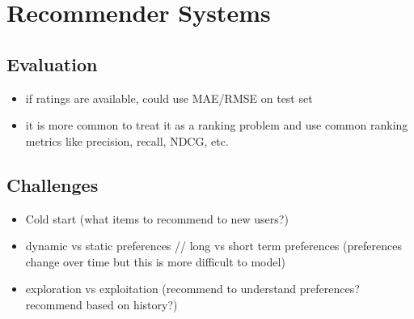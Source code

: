 \section{Recommender Systems}
\subsection{Evaluation}
\begin{itemize}
    \item if ratings are available, could use MAE/RMSE on test set
    \item it is more common to treat it as a ranking problem and use common ranking metrics like precision, recall, NDCG, etc.
\end{itemize}
\subsection{Challenges}
\begin{itemize}
    \item Cold start (what items to recommend to new users?)
    \item dynamic vs static preferences // long vs short term preferences (preferences change over time but this is more difficult to model)
    \item exploration vs exploitation (recommend to understand preferences? recommend based on history?)
\end{itemize}
